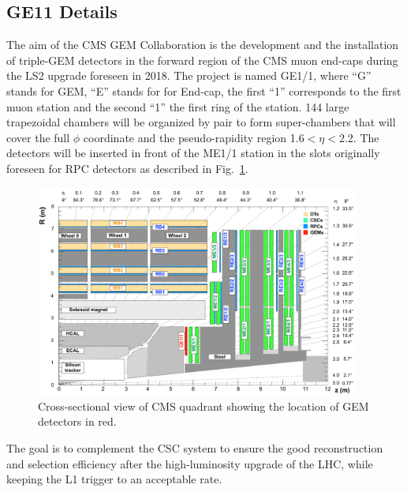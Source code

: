 \subsection{GE11 Details}
The aim of the CMS GEM Collaboration is the development and the installation of triple-GEM detectors in the forward region of the CMS muon end-caps during the LS2 upgrade foreseen in 2018. The project is named GE1/1, where ``G'' stands for GEM, ``E'' stands for for End-cap, the first ``1'' corresponds to the first muon station and the second ``1'' the first ring of the station. 144 large trapezoidal chambers will be organized by pair to form super-chambers that will cover the full $\phi$ coordinate and the pseudo-rapidity region 1.6$ < \eta < $2.2.
The detectors will be inserted in front of the ME1/1 station in the slots originally foreseen for RPC detectors as described in Fig.~\ref{fig:GE11pos}. 
\begin{figure}[!htbp]
	\centering
	\includegraphics[width=0.95\textwidth]{figures/GEM/cms_upg_o_g_b_ni_ge1_r_140227.pdf}
	\caption{Cross-sectional view of CMS quadrant showing the location of GEM detectors in red.}
	\label{fig:GE11pos}
\end{figure}
The goal is to complement the CSC system to ensure the good reconstruction and selection efficiency after the high-luminosity upgrade of the LHC, while keeping the L1 trigger to an acceptable rate. 
